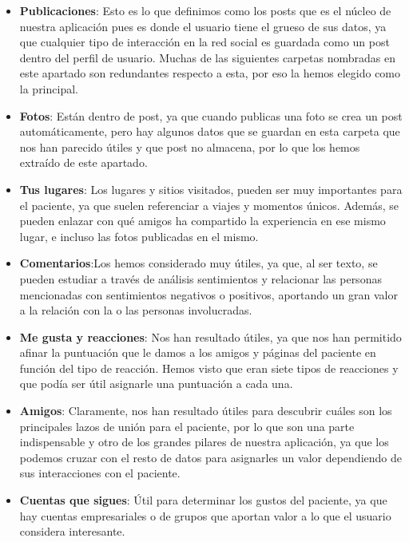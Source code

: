 \begin{itemize}
	\item \textbf{Publicaciones}: Esto es lo que definimos como los posts que es el núcleo de nuestra aplicación pues es donde el usuario tiene el grueso de sus datos, ya que cualquier tipo de interacción en la red social es guardada como un post dentro del perfil de usuario. Muchas de las siguientes carpetas nombradas en este apartado son redundantes respecto a esta, por eso la hemos elegido como la principal.
	
	\item \textbf{Fotos}: Están dentro de post, ya que cuando publicas una foto se crea un post automáticamente, pero hay algunos datos que se guardan en esta carpeta que nos han parecido útiles y que post no almacena, por lo que los hemos extraído de este apartado.
	
	\item \textbf{Tus lugares}: Los lugares y sitios visitados, pueden ser muy importantes para el paciente, ya que suelen referenciar a viajes y momentos únicos. Además, se pueden enlazar con qué amigos ha compartido la experiencia en ese mismo lugar, e incluso las fotos publicadas en el mismo.
	
	\item \textbf{Comentarios}:Los hemos considerado muy útiles, ya que, al ser texto, se pueden estudiar a través de análisis sentimientos y relacionar las personas mencionadas con sentimientos negativos o positivos, aportando un gran valor a la relación con la o las personas involucradas.
	
	\item \textbf{Me gusta y reacciones}: Nos han resultado útiles, ya que nos han permitido afinar la puntuación que le damos a los amigos y páginas del paciente en función del tipo de reacción. Hemos visto que eran siete tipos de reacciones y que podía ser útil asignarle una puntuación a cada una.
	
	\item \textbf{Amigos}: Claramente, nos han resultado útiles para descubrir cuáles son los principales lazos de unión para el paciente, por lo que son una parte indispensable y otro de los grandes pilares de nuestra aplicación, ya que los podemos cruzar con el resto de datos para asignarles un valor dependiendo de sus interacciones con el paciente.
		
	\item \textbf{Cuentas que sigues}: Útil para determinar los gustos del paciente, ya que hay cuentas empresariales o de grupos que aportan valor a lo que el usuario considera interesante.
	

\end{itemize}
